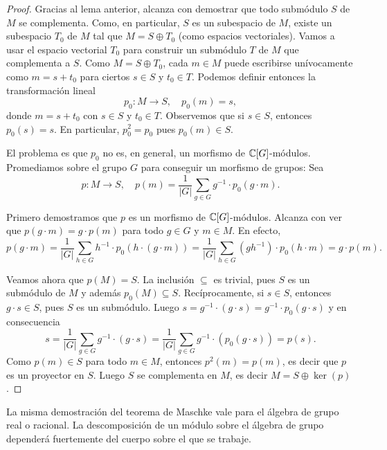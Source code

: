 \begin{proof}
Gracias al lema anterior, alcanza con demostrar que todo submódulo $S$ de $M$ se complementa. 
Como, en particular, $S$ es un subespacio de $M$, existe un subespacio $T_0$ de $M$ 
tal que $M=S\oplus T_0$ (como espacios vectoriales). Vamos a usar el espacio vectorial
$T_0$ para construir un submódulo $T$ de $M$ que complementa a $S$. Como $M=S\oplus T_0$, 
cada $m\in M$ puede escribirse unívocamente como $m=s+t_0$ para ciertos $s\in S$ y $t_0\in T$. 
Podemos definir entonces la transformación lineal 
\[
p_0\colon M\to S,\quad
p_0(m)=s,
\]
donde $m=s+t_0$ con $s\in S$ y $t_0\in T$. 
Observemos que si $s\in S$, entonces $p_0(s)=s$. En particular, $p_0^2=p_0$ pues
$p_0(m)\in S$. 

El problema 
es que $p_0$ no es, en general, un morfismo de $\mathbb{C}[G]$-módulos. Promediamos
sobre el grupo $G$ para conseguir un morfismo de grupos: Sea 
\[
p\colon M\to S,\quad
p(m)=\frac{1}{|G|}\sum_{g\in G}g^{-1}\cdot p_0(g\cdot m).
\]

Primero demostramos que $p$ es un morfismo de $\mathbb{C}[G]$-módulos. Alcanza con ver que
$p(g\cdot m)=g\cdot p(m)$ para todo $g\in G$ y $m\in M$. En efecto,
\[
p(g\cdot m)=\frac{1}{|G|}\sum_{h\in G}h^{-1}\cdot p_0(h\cdot (g\cdot m))
=\frac{1}{|G|}\sum_{h\in G}(gh^{-1})\cdot p_0(h\cdot m)=g\cdot p(m).
\]

Veamos ahora que $p(M)=S$. La inclusión $\subseteq$ es trivial, pues $S$ es un submódulo de $M$ 
y además $p_0(M)\subseteq S$. Recíprocamente, si $s\in S$, entonces $g\cdot s\in S$, pues
$S$ es un submódulo. Luego 
$s=g^{-1}\cdot (g\cdot s)=g^{-1}\cdot p_0(g\cdot s)$ y en consecuencia
\[
s=\frac{1}{|G|}\sum_{g\in G}g^{-1}\cdot (g\cdot s)=\frac{1}{|G|}\sum_{g\in G}g^{-1}\cdot (p_0(g\cdot s))=p(s).
\]
Como $p(m)\in S$ para todo $m\in M$, entonces $p^2(m)=p(m)$, es decir que $p$ es un proyector en $S$. Luego $S$ se complementa en $M$, es decir $M=S\oplus\ker(p)$.
\end{proof} 

La misma demostración del teorema de Maschke vale para el álgebra de grupo real o racional. 
La descomposición de un módulo sobre el álgebra de grupo dependerá
fuertemente del cuerpo sobre el que se trabaje. 

